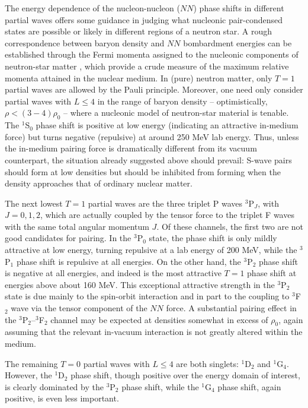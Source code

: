 The energy dependence of the nucleon-nucleon ($NN$) phase shifts in different 
partial waves offers some guidance in judging what nucleonic pair-condensed 
states are possible or likely in different regions of a neutron star.
A rough correspondence between baryon density and $NN$ bombardment energies
can be established through the Fermi momenta assigned to the nucleonic
components of neutron-star matter \cite{ttr}, which provide a crude
measure of the maximum relative momenta attained in the nuclear medium.
In (pure) neutron matter, only $T=1$ partial waves are allowed by the
Pauli principle.  Moreover, one need only consider partial 
waves with $L\leq 4$ in the range of baryon density -- optimistically,
$\rho < (3-4) \rho_0$ -- where a nucleonic model of neutron-star material 
is tenable.  The $^1$S$_0$ phase shift is positive at low energy 
(indicating an attractive in-medium force) but turns negative (repulsive) 
at around 250 MeV lab energy.  Thus, unless the in-medium pairing force 
is dramatically different from its vacuum counterpart, the situation 
already suggested above should prevail:  S-wave pairs should form at 
low densities but should be inhibited from forming when the density 
approaches that of ordinary nuclear matter.  

The next lowest $T=1$ partial waves are the three triplet 
P waves $^3$P$_J$, with $J=0,1,2$, which are actually coupled 
by the tensor force to the triplet F waves with the same total 
angular momentum $J$.  Of these channels, the first two are not
good candidates for pairing.  In the $^3$P$_0$ state, the
phase shift is only mildly attractive at low energy, turning
repulsive at a lab energy of 200 MeV, while the $^3$P$_1$ phase
shift is repulsive at all energies.  On the other hand, the
$^3$P$_2$ phase shift is negative at all energies, and indeed
is the most attractive $T=1$ phase shift at energies above
about 160 MeV.  This exceptional attractive strength in the
$^3$P$_2$ state is due mainly to the spin-orbit interaction and in
part to the coupling to $^3$F$_2$ wave via the tensor component
of the $NN$ force.  A substantial pairing effect in the
$^3$P$_2$--$^3$F$_2$ channel may be expected at densities somewhat 
in excess of $\rho_0$, again assuming that the relevant in-vacuum 
interaction is not greatly altered within the medium.  

The remaining $T=0$ partial waves with $L\leq 4$ are both
singlets: $^1$D$_2$ and $^1$G$_4$.  However, the $^1$D$_2$
phase shift, though positive over the energy domain of interest,
is clearly dominated by the $^3$P$_2$ phase shift, while the
$^1$G$_4$ phase shift, again positive, is even less important.

